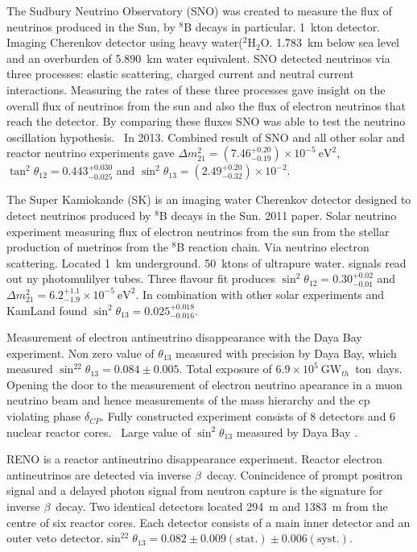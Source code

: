 The Sudbury Neutrino Observatory (SNO) was created to measure the flux
of neutrinos produced in the Sun, by $^8$B decays in particular.
1~kton detector. Imaging Cherenkov detector using
heavy water($^2\text{H}_2\text{O}$. 1.783~km below sea level and an 
overburden of 5.890~km water equivalent. SNO detected neutrinos via 
three processes: elastic scattering, charged current and neutral
current interactions. Measuring the rates of these three processes
gave insight on the overall flux of neutrinos from the sun and also
the flux of electron neutrinos that reach the
detector. By comparing these fluxes SNO was able to test the neutrino
oscillation hypothesis.~\cite{SNO:PhysRevC.81.055504}   
In 2013. Combined result of SNO and all other solar and reactor
neutrino experiments gave
$\Delta m^2_{21} = (7.46^{+0.20}_{-0.19}) \times 10^{-5}~\text{eV}^2$, 
$\tan^2\theta_{12} = 0.443^{+0.030}_{-0.025}$ and 
$\sin^2\theta_{13} = (2.49^{+0.20}_{-0.32}) \times
10^{-2}$.~\cite{SNO:PhysRevC.88.025501}  


The Super Kamiokande (SK) is an imaging water Cherenkov detector
designed to detect neutrinos produced by $^8$B decays in the Sun.
2011 paper. Solar neutrino experiment measuring flux of electron
neutrinos from the sun from the stellar production of nuetrinos from
the $^8$B reaction chain. Via neutrino electron scattering. Located
1~km underground. 50~ktons of ultrapure water. signals read out ny
photomulilyer tubes.
Three flavour fit produces
$\sin^2\theta_{12} = 0.30 ^{+0.02}_{-0.01}$ and $\Delta m^2_{21} = 6.2
^{+1.1}_{-1.9} \times 10^{-5}~\text{eV}^2$.  In combination with other solar
experiments and KamLand found $\sin^2\theta_{13} =
0.025^{+0.018}_{-0.016}$.~\cite{SK:PhysRevD.73.112001}~\cite{SK:PhysRevD.83.052010} 


Measurement of electron antineutrino disappearance with the Daya Bay
experiment. Non zero value of $\theta_{13}$ measured with precision by
Daya Bay, which measured $\sin^22\theta_{13} = 0.084 \pm 0.005$.  
Total exposure of $6.9 \times 10^5~\text{GW}_{th}$~ton~days.
Opening the door to the measurement of electron neutrino 
apearance in a muon neutrino beam and hence measurements of the mass 
hierarchy and the cp violating phase $\delta_{CP}$.
Fully constructed experiment consists of 8 detectors and 6 nuclear
reactor cores.~\cite{DayaBay-PhysRevLett.115.111802}
Large value of $\sin^2\theta_{13}$ measured by Daya Bay \cite{DayaBay2012}.

RENO is a reactor antineutrino disappearance experiment. Reactor
electron antineutrinos are detected via inverse
$\beta$~decay. Conincidence of prompt positron signal and a delayed
photon signal from neutron capture is the signature for inverse $\beta$~decay.
Two identical detectors located 
294~m and 1383~m from the centre of six reactor
cores. Each detector consists of a main inner detector and an outer
veto detector.$\sin^22\theta_{13} = 0.082 \pm 0.009(\text{stat.}) \pm
0.006(\text{syst.})$. \cite{RENO:2015ksa}~\cite{RENO:PhysRevLett.108.191802}

